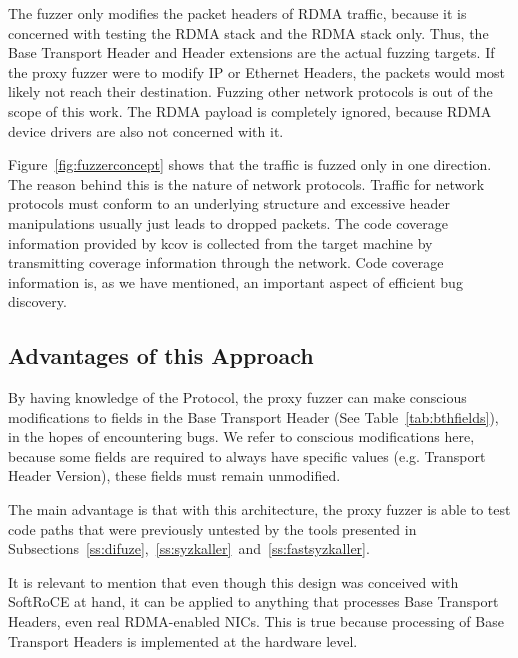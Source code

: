 The fuzzer only modifies the packet headers of RDMA traffic, because it is concerned
with testing the RDMA stack and the RDMA stack only. Thus, the Base Transport Header and Header extensions
are the actual fuzzing targets.  If the proxy fuzzer were to modify IP or Ethernet Headers,
the packets would most likely not reach their destination. Fuzzing other
network protocols is out of the scope of this work. The RDMA payload is completely ignored,
because RDMA device drivers are also not concerned with it. %

Figure~\ref{fig:fuzzerconcept} shows that the traffic is fuzzed only in one direction. The reason
behind this is the nature of network protocols. Traffic for network protocols must conform to an underlying
structure and excessive header manipulations usually just leads to dropped packets. The code coverage information provided by
kcov is collected from the target machine by transmitting coverage information through the network. Code
coverage information is, as we have mentioned, an important aspect of efficient bug discovery.

\subsection{Advantages of this Approach}

By having knowledge of the Protocol, the proxy fuzzer can make conscious modifications to fields in the Base Transport
Header (See Table~\ref{tab:bthfields}), in the hopes of encountering bugs. We refer to conscious modifications here,
because some fields are required to always have specific values (e.g. Transport Header Version), these fields must remain unmodified.

The main advantage is that with this architecture, the proxy fuzzer is able to test code paths
that were previously untested by the tools presented in Subsections~\ref{ss:difuze},~\ref{ss:syzkaller}~and~\ref{ss:fastsyzkaller}.

It is relevant to mention that even though this design was conceived with
SoftRoCE at hand, it can be applied to anything that processes Base
Transport Headers, even real RDMA-enabled NICs. This is true because processing of
Base Transport Headers is implemented at the hardware level.








